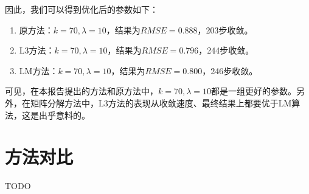\documentclass[a4paper,12pt]{article}
\begin{document}
    因此，我们可以得到优化后的参数如下：
    \begin{enumerate}
      \item 原方法：$k=70,\lambda=10$，结果为$RMSE=0.888$，203步收敛。
      \item L3方法：$k=70,\lambda=10$，结果为$RMSE=0.796$，244步收敛。
      \item LM方法：$k=70,\lambda=10$，结果为$RMSE=0.800$，246步收敛。
    \end{enumerate}

    可见，在本报告提出的方法和原方法中，$k=70,\lambda=10$都是一组更好的参数。另外，在矩阵分解方法中，L3方法的表现从收敛速度、最终结果上都要优于LM算法，这是出乎意料的。
    \section{方法对比}
    TODO

    \label{applastpage}
    \newpage
    
    
\iffalse
\begin{itemize}[noitemsep,topsep=0pt]
\end{itemize}
\begin{enumerate}[label=\Roman{*}.,noitemsep,topsep=0pt]
\end{enumerate}
\begin{multicols}{2}
\end{multicols}
\fi
\end{document}
